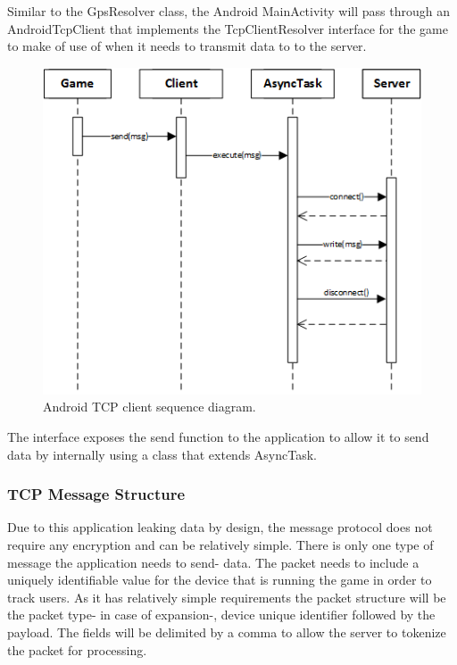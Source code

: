 Similar to the GpsResolver class, the Android MainActivity will pass through an AndroidTcpClient that implements the TcpClientResolver interface for the game to make of use of when it needs to transmit data to to the server.
\newpage
\begin{figure}[h!]
\centering\includegraphics[width=\linewidth]{design/figures/tcp-client-sd.png}
\caption{Android TCP client sequence diagram.}
\end{figure}

The interface exposes the send function to the application to allow it to send data by internally using a class that extends AsyncTask.

\subsubsection{TCP Message Structure}
\label{design:tcp-structure}
Due to this application leaking data by design, the message protocol does not require any encryption and can be relatively simple. There is only one type of message the application needs to send- data. The packet needs to include a uniquely identifiable value for the device that is running the game in order to track users. As it has relatively simple requirements the packet structure will be the packet type- in case of expansion-, device unique identifier followed by the payload. The fields will be delimited by a comma to allow the server to tokenize the packet for processing.

